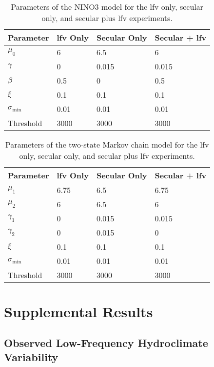 \documentclass[
  draft,
  linenumbers
]{agujournal2018}
\begin{document}
\begin{table}[ht]
  \centering
  \begin{tabular}{llll}
    \toprule
    Parameter & \gls{lfv} Only & Secular Only & Secular + \gls{lfv} \\
    \midrule
    $\mu_0$             & 6     & 6.5   & 6 \\
    $\gamma$            & 0     & 0.015 & 0.015\\
    $\beta$             & 0.5   & 0     & 0.5\\
    $\xi$               & 0.1   & 0.1   & 0.1\\
    $\sigma_\text{min}$ & 0.01  & 0.01  & 0.01\\
    Threshold           & 3000  & 3000  & 3000 \\
    \bottomrule
  \end{tabular}
  \caption{
    Parameters of the NINO3 model for the \gls{lfv} only, secular only, and secular plus \gls{lfv} experiments.
  }\label{tab:nino-stationary}
\end{table}
\begin{table}[ht]
  \centering
  \begin{tabular}{llll}
    \toprule
    Parameter & \gls{lfv} Only & Secular Only & Secular + \gls{lfv} \\
    \midrule
    $\mu_1$             & 6.75  & 6.5   & 6.75\\
    $\mu_2$             & 6     & 6.5   & 6\\
    $\gamma_1$          & 0     & 0.015 & 0.015\\
    $\gamma_2$          & 0     & 0.015 & 0\\
    $\xi$               & 0.1   & 0.1   & 0.1\\
    $\sigma_\text{min}$ & 0.01  & 0.01  & 0.01\\
    Threshold           & 3000  & 3000  & 3000 \\
    \bottomrule
  \end{tabular}
  \caption{
    Parameters of the two-state Markov chain model for the \gls{lfv} only, secular only, and secular plus \gls{lfv} experiments.
  }\label{tab:markov-stationary}
\end{table}

\section{Supplemental Results}

\subsection{Observed Low-Frequency Hydroclimate Variability}\label{sec:observed-lfv}
\end{document}
